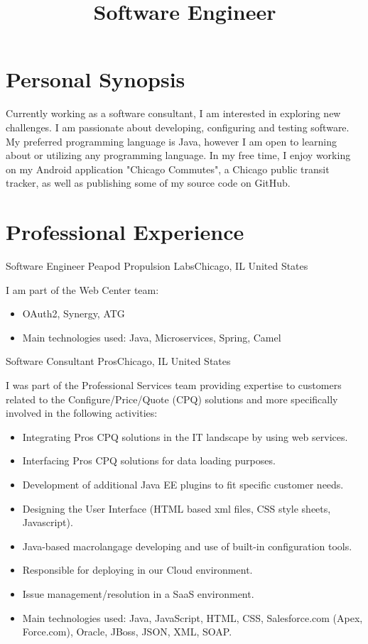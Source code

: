 \documentclass[12pt,a4paper]{moderncv}
\title{Software Engineer}
\begin{document}
\maketitle

\section{Personal Synopsis}
Currently working as a software consultant, I am interested in exploring new challenges. I am passionate about developing, configuring and testing software. My preferred programming language is Java, however I am open to learning about or utilizing any programming language. In my free time, I enjoy working on my Android application "Chicago Commutes", a Chicago public transit tracker, as well as publishing some of my source code on GitHub.

\section{Professional Experience}
		{Software Engineer}
		{Peapod Propulsion Labs}{Chicago, IL}
		{United States}
		{
		I am part of the Web Center team: 
		\begin{itemize}[label=\textbullet]
		    \item OAuth2, Synergy, ATG
		    \item Main technologies used: Java, Microservices, Spring, Camel
		\end{itemize}
		}{}
		{Software Consultant}
		{Pros}{Chicago, IL}
		{United States}
		{
		I was part of the Professional Services team providing expertise to customers related to the Configure/Price/Quote (CPQ) solutions and more specifically involved in the following activities: 
		\begin{itemize}[label=\textbullet]
		    \item Integrating Pros CPQ solutions in the IT landscape by using web services.
		    \item Interfacing Pros CPQ solutions for data loading purposes.
		    \item Development of additional Java EE plugins to fit specific customer needs.
		    \item Designing the User Interface (HTML based xml files, CSS style sheets, Javascript).
		    \item Java-based macrolangage developing and use of built-in configuration tools.
		    \item Responsible for deploying in our Cloud environment.
		    \item Issue management/resolution in a SaaS environment.
		    \item Main technologies used: Java, JavaScript, HTML, CSS, Salesforce.com (Apex, Force.com), Oracle, JBoss, JSON, XML, SOAP.
		\end{itemize}
		}{}
\end{document}
